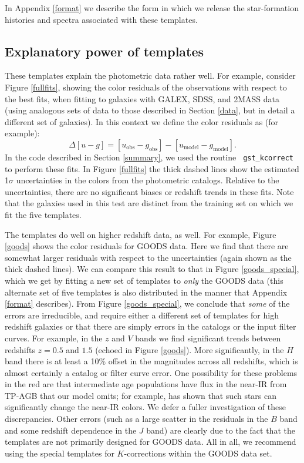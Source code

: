\documentclass[12pt,preprint]{aastex}
\begin{document}
In Appendix \ref{format} we describe the form in which we release the
star-formation histories and spectra associated with these templates.

\subsection{Explanatory power of templates}

These templates explain the photometric data rather well. For example,
consider Figure \ref{fullfits}, showing the color residuals of the
observations with respect to the best fits, when fitting to galaxies
with GALEX, SDSS, and 2MASS data (using analogous sets of data to 
those described in Section \ref{data}, but in detail a different
set of galaxies). In this context we define the color
residuals as (for example):
\begin{equation}
\Delta [u-g] = [u_{\mathrm{obs}}- g_{\mathrm{obs}}] -
[u_{\mathrm{model}}- g_{\mathrm{model}}] .
\end{equation}
In the code described in Section \ref{summary}, we used the routine {\tt
gst\_kcorrect} to perform these fits.  In Figure \ref{fullfits} the
thick dashed lines show the estimated 1$\sigma$ uncertainties in the
colors from the photometric catalogs. Relative to the uncertainties,
there are no significant biases or redshift trends in these fits. Note
that the galaxies used in this test are distinct from the training set
on which we fit the five templates.

The templates do well on higher redshift data, as well. For example,
Figure \ref{goods} shows the color residuals for GOODS data. Here we
find that there are somewhat larger residuals with respect to the
uncertainties (again shown as the thick dashed lines). We can compare
this result to that in Figure \ref{goods_special}, which we get by
fitting a new set of templates to {\it only} the GOODS data (this
alternate set of five templates is also distributed in the manner that
Appendix \ref{format} describes). From Figure \ref{goods_special}, we
conclude that {\it some} of the errors are irreducible, and require
either a different set of templates for high redshift galaxies or that
there are simply errors in the catalogs or the input filter
curves. For example, in the $z$ and $V$ bands we find significant
trends between redshifts $z=0.5$ and $1.5$ (echoed in Figure
\ref{goods}). More significantly, in the $H$ band there is at least a
10\% offset in the magnitudes across all redshifts, which is almost
certainly a catalog or filter curve error. One possibility for these
problems in the red are that intermediate age populations have flux in
the near-IR from TP-AGB that our model omits; for example,
\citet{maraston05a} has shown that such stars can significantly change
the near-IR colors. We defer a fuller investigation of these
discrepancies.  Other errors (such as a large scatter in the residuals
in the $B$ band and some redshift dependence in the $J$ band) are
clearly due to the fact that the templates are not primarily designed
for GOODS data. All in all, we recommend using the special templates
for $K$-corrections within the GOODS data set.
\end{document}
